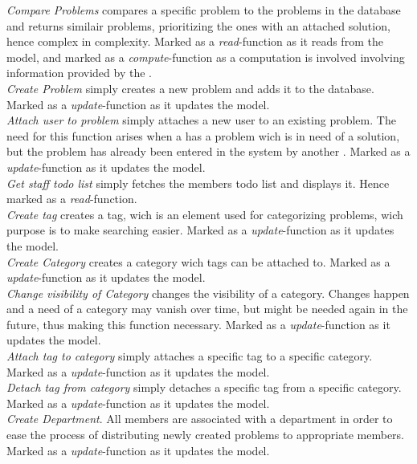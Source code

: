 \emph{Compare Problems} compares a specific problem to the problems in the database and returns similair problems, prioritizing the ones with an attached solution, hence complex in complexity. Marked as a \textit{read}-function as it reads from the model, and marked as a \textit{compute}-function as a computation is involved involving information provided by the \client. \\
\emph{Create Problem} simply creates a new problem and adds it to the database. Marked as a \textit{update}-function as it updates the model.  \\
\emph{Attach user to problem} simply attaches a new user to an existing problem. The need for this function arises when a \client has a problem wich is in need of a solution, but the problem has already been entered in the system by another \client. Marked as a \textit{update}-function as it updates the model. \\
\emph{Get staff todo list} simply fetches the \astaff[] members todo list and displays it. Hence marked as a \textit{read}-function. \\
\emph{Create tag} creates a tag, wich is an element used for categorizing problems, wich purpose is to make searching easier. Marked as a \textit{update}-function as it updates the model. \\
\emph{Create Category} creates a category wich tags can be attached to. Marked as a \textit{update}-function as it updates the model. \\
\emph{Change visibility of Category} changes the visibility of a category. Changes happen and a need of a category may vanish over time, but might be needed again in the future, thus making this function necessary. Marked as a \textit{update}-function as it updates the model. \\
\emph{Attach tag to category} simply attaches a specific tag to a specific category. Marked as a \textit{update}-function as it updates the model. \\
\emph{Detach tag from category} simply detaches a specific tag from a specific category. Marked as a \textit{update}-function as it updates the model. \\
\emph{Create Department}. All \astaff[] members are associated with a department in order to ease the process of distributing newly created problems to appropriate \astaff[] members. Marked as a \textit{update}-function as it updates the model. \\
